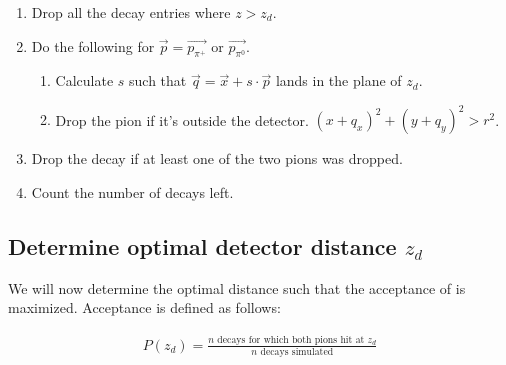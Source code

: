 \documentclass[12pt,a4paper,oneside,english]{article}
\begin{document}
		\begin{enumerate}
			\item Drop all the decay entries where $z > z_d$.
			\item Do the following for $\overrightarrow{p} = \overrightarrow{p_{\pi^+}}$ or $\overrightarrow{p_{\pi^0}}$.
			\begin{enumerate}
				\item Calculate $s$ such that $\overrightarrow{q} = \overrightarrow{x} + s \cdot \overrightarrow{p}$ lands in the plane of $z_d$.
				\item Drop the pion if it's outside the detector. $ (x + q_x)^2 + (y + q_y)^2 > r^2$. %
			\end{enumerate}
			\item Drop the decay if at least one of the two pions was dropped.
			\item Count the number of decays left. %
		\end{enumerate}
	
%
	
%		
%		
%		
%		

	
\subsection{Determine optimal detector distance $z_d$}
\label{optimal detector distance}
	We will now determine the optimal distance such that the acceptance of is maximized. Acceptance is defined as follows:
	
	\begin{align}
		P(z_d) = \frac{\text{$n$ decays for which both pions hit at $z_d$}}{\text{$n$ decays simulated}} 
	\end{align}
	
\end{document}
